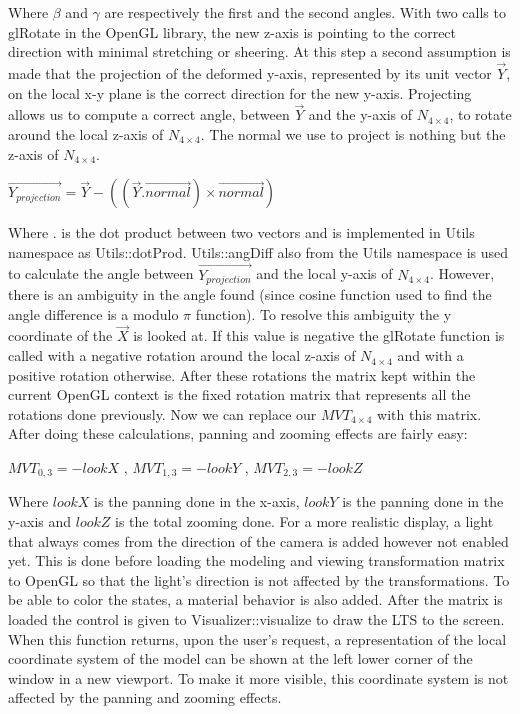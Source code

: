 \documentclass[a4paper]{article}
\begin{document}
Where $\beta$ and $\gamma$ are respectively the first and the second angles. With two calls to glRotate in the OpenGL library, the new z-axis is pointing to the correct direction with minimal stretching or sheering. At this step a second assumption is made that the projection of the deformed y-axis, represented by its unit vector $\vec{Y}$, on the local x-y plane is the correct direction for the new y-axis. Projecting allows us to compute a correct angle, between $\vec{Y}$ and the y-axis of $N_{4 \times 4}$, to rotate around the local z-axis of $N_{4 \times 4}$. The normal we use to project is nothing but the z-axis of $N_{4 \times 4}$.
\begin{center}
\begin{math}
\vec{Y_{projection}} = \vec{Y} - ((\vec{Y}.\vec{normal}) \times \vec{normal})
\end{math}
\end{center}
Where $.$ is the dot product between two vectors and is implemented in Utils namespace as Utils::dotProd. Utils::angDiff also from the Utils namespace is used to calculate the angle between $\vec{Y_{projection}}$ and the local y-axis of $N_{4 \times 4}$. However, there is an ambiguity in the angle found (since cosine function used to find the angle difference is a modulo $\pi$ function). To resolve this ambiguity the y coordinate of the $\vec{X}$ is looked at. If this value is negative the glRotate function is called with a negative rotation around the local z-axis of $N_{4 \times 4}$ and with a positive rotation otherwise. After these rotations the matrix kept within the current OpenGL context is the fixed rotation matrix that represents all the rotations done previously. Now we can replace our $MVT_{4 \times 4}$ with this matrix.
After doing these calculations, panning and zooming effects are fairly easy:
\begin{center}
\begin{math}
MVT_{0,3} = -lookX
\end{math}
,
\begin{math}
MVT_{1,3} = -lookY
\end{math}
,
\begin{math}
MVT_{2,3} = -lookZ
\end{math}
\end{center}
Where $lookX$ is the panning done in the x-axis, $lookY$ is the panning done in the y-axis and $lookZ$ is the total zooming done. For a more realistic display, a light that always comes from the direction of the camera is added however not enabled yet. This is done before loading the modeling and viewing transformation matrix to OpenGL so that the light's direction is not affected by the transformations. To be able to color the states, a material behavior is also added. After the matrix is loaded the control is given to Visualizer::visualize to draw the LTS to the screen. When this function returns, upon the user's request, a representation of the local coordinate system of the model can be shown at the left lower corner of the window in a new viewport. To make it more visible, this coordinate system is not affected by the panning and zooming effects.
\end{document}

